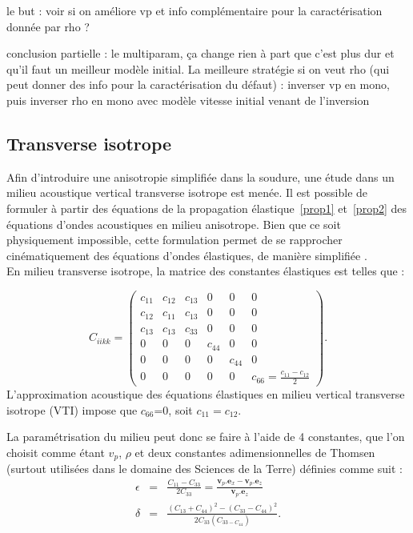 le but : voir si on améliore vp et info complémentaire pour la caractérisation donnée par rho ?

conclusion partielle : le multiparam, ça change rien à part que c'est plus dur et qu'il faut un meilleur modèle initial. La meilleure stratégie si on veut rho (qui peut donner des info pour la caractérisation du défaut) : inverser vp en mono, puis inverser rho en mono avec modèle vitesse initial venant de l'inversion




\subsection{Transverse isotrope}
Afin d'introduire une anisotropie simplifiée dans la soudure, une étude dans un milieu acoustique vertical transverse isotrope est menée.
Il est possible de formuler à partir des équations de la propagation élastique~\ref{prop1} et~\ref{prop2} des équations d'ondes acoustiques en milieu anisotrope. Bien que ce soit physiquement impossible, cette formulation permet de se rapprocher cinématiquement des équations d'ondes élastiques, de manière simplifiée \citep{alkhalifah}.\\
En milieu transverse isotrope, la matrice des constantes élastiques est telles que  : 

\begin{equation}
	C_{iikk} = \begin{pmatrix}
		c_{11} & c_{12} & c_{13} & 0 & 0 & 0 \\
		c_{12} & c_{11} & c_{13} & 0 & 0 & 0 \\
		c_{13} & c_{13} & c_{33} & 0 & 0 & 0 \\
		0 & 0 & 0 & c_{44} & 0 & 0 \\
		0 & 0 & 0 & 0 &c_{44} & 0 \\
		0 & 0 & 0 & 0 & 0 & c_{66} = \frac{c_{11}-c_{12}}{2}
	\end{pmatrix}.
\end{equation}
L'approximation acoustique des équations élastiques en milieu vertical transverse isotrope (VTI) impose que $c_{66}$=0, soit $c_{11}=c_{12}$.
 

La paramétrisation du milieu peut donc se faire à l'aide de 4 constantes, que l'on choisit comme étant $v_{p}$, $\rho$ et deux constantes adimensionnelles de Thomsen~\citep{thomsen} (surtout utilisées dans le domaine des Sciences de la Terre) définies comme suit : 
\begin{eqnarray}
	\epsilon & =  & \frac{C_{11}-C_{33}}{2C_{33}} = \frac{\bm{v}_{p}.\bm{e}_{x} -  \bm{v}_{p}.\bm{e}_{z}}{\bm{v}_{p}.\bm{e}_{z}}\\
	\delta & = & \frac{(C_{13}+C_{44})^2-(C_{33}-C_{44})^2}{2C_{33}(C_{33-C_{44}})}\text{.}\\
\end{eqnarray}

